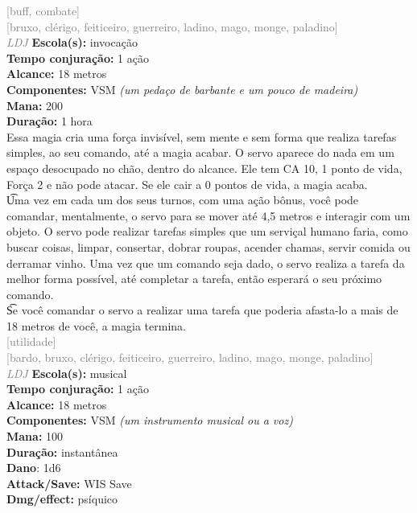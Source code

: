 \documentclass{RPG_Adventure}[2021/10/20]
\begin{document}
{\scriptsize \textcolor{gray}{[buff, combate]\\}}
{\scriptsize \textcolor{gray}{[bruxo, clérigo, feiticeiro, guerreiro, ladino, mago, monge, paladino]\\}}
{\tiny \textcolor{gray}{\textit{LDJ}}}
{\small \t \textbf{Escola(s):} invocação\\\t \textbf{Tempo conjuração:} 1 ação\\\t \textbf{Alcance:} 18 metros\\\t \textbf{Componentes:} VSM \textit{(um pedaço de barbante e um pouco de madeira)}\\\t \textbf{Mana:} 200\\\t \textbf{Duração:} 1 hora\\}
{\normalsize Essa magia cria uma força invisível, sem mente e sem forma que realiza tarefas simples, ao seu comando, até a magia acabar. O servo aparece do nada em um espaço desocupado no chão, dentro do alcance. Ele tem CA 10, 1 ponto de vida, Força 2 e não pode atacar. Se ele cair a 0 pontos de vida, a magia acaba.\\\t Uma vez em cada um dos seus turnos, com uma ação bônus, você pode comandar, mentalmente, o servo para se mover até 4,5 metros e interagir com um objeto. O servo pode realizar tarefas simples que um serviçal humano faria, como buscar coisas, limpar, consertar, dobrar roupas, acender chamas, servir comida ou derramar vinho. Uma vez que um comando seja dado, o servo realiza a tarefa da melhor forma possível, até completar a tarefa, então esperará o seu próximo comando.\\\t Se você comandar o servo a realizar uma tarefa que poderia afasta-lo a mais de 18 metros de você, a magia termina.\\}
{\scriptsize \textcolor{gray}{[utilidade]\\}}
{\scriptsize \textcolor{gray}{[bardo, bruxo, clérigo, feiticeiro, guerreiro, ladino, mago, monge, paladino]\\}}
{\tiny \textcolor{gray}{\textit{LDJ}}}
{\small \t \textbf{Escola(s):} musical\\\t \textbf{Tempo conjuração:} 1 ação\\\t \textbf{Alcance:} 18 metros\\\t \textbf{Componentes:} VSM \textit{(um instrumento musical ou a voz)}\\\t \textbf{Mana:} 100\\\t \textbf{Duração:} instantânea\\\t \textbf{Dano}: 1d6\\\t \textbf{Attack/Save:} WIS Save\\\t \textbf{Dmg/effect:} psíquico\\}
\end{document}
